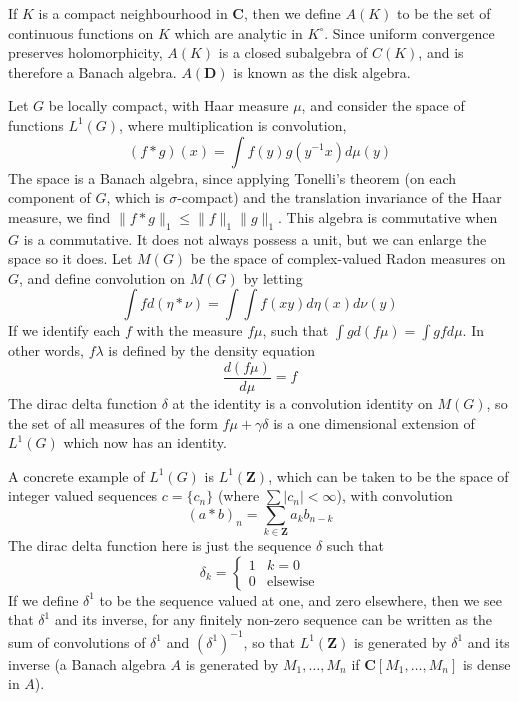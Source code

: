 \begin{example}
    If $K$ is a compact neighbourhood in $\mathbf{C}$, then we define $A(K)$ to be the set of continuous functions on $K$ which are analytic in $K^\circ$. Since uniform convergence preserves holomorphicity, $A(K)$ is a closed subalgebra of $C(K)$, and is therefore a Banach algebra. $A(\mathbf{D})$ is known as the disk algebra.
\end{example}

\begin{example}
    Let $G$ be locally compact, with Haar measure $\mu$, and consider the space of functions $L^1(G)$, where multiplication is convolution,
    \[ (f * g)(x) = \int f(y) g(y^{-1}x) d\mu(y) \]
    The space is a Banach algebra, since applying Tonelli's theorem (on each component of $G$, which is $\sigma$-compact) and the translation invariance of the Haar measure, we find $\| f * g \|_1 \leq \| f \|_1 \| g \|_1$. This algebra is commutative when $G$ is a commutative. It does not always possess a unit, but we can enlarge the space so it does. Let $M(G)$ be the space of complex-valued Radon measures on $G$, and define convolution on $M(G)$ by letting
    \[ \int f d (\eta * \nu) = \int \int f(xy) d\eta(x) d\nu(y) \]
    If we identify each $f$ with the measure $f \mu$, such that $\int g d(f \mu) = \int g f d\mu$. In other words, $f \lambda$ is defined by the density equation
    \[ \frac{d(f \mu)}{d \mu} = f \]
    The dirac delta function $\delta$ at the identity is a convolution identity on $M(G)$, so the set of all measures of the form $f \mu + \gamma \delta$ is a one dimensional extension of $L^1(G)$ which now has an identity.
\end{example}

\begin{example}
    A concrete example of $L^1(G)$ is $L^1(\mathbf{Z})$, which can be taken to be the space of integer valued sequences $c = \{ c_n \}$ (where $\sum |c_n| < \infty$), with convolution
    \[ (a * b)_n = \sum_{k \in \mathbf{Z}} a_k b_{n-k} \]
    The dirac delta function here is just the sequence $\delta$ such that
    \[ \delta_k = \begin{cases} 1 & k = 0 \\ 0 & \text{elsewise} \end{cases} \]
    If we define $\delta^1$ to be the sequence valued at one, and zero elsewhere, then we see that $\delta^1$ and its inverse, for any finitely non-zero sequence can be written as the sum of convolutions of $\delta^1$ and $(\delta^1)^{-1}$, so that $L^1(\mathbf{Z})$ is generated by $\delta^1$ and its inverse (a Banach algebra $A$ is generated by $M_1, \dots, M_n$ if $\mathbf{C}[M_1, \dots, M_n]$ is dense in $A$).
\end{example}

